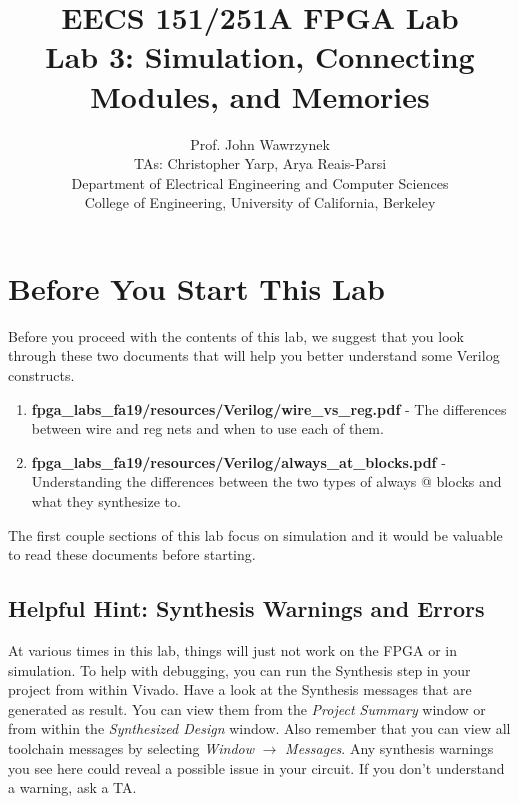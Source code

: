\documentclass[11pt]{article}
\newcommand{\RepoRootPath}{fpga\_labs\_fa19}
\begin{document}
\title{EECS 151/251A FPGA Lab\\
Lab 3: Simulation, Connecting Modules, and Memories}

\author{Prof. John Wawrzynek \\
TAs: Christopher Yarp, Arya Reais-Parsi \\Department of Electrical Engineering and Computer Sciences\\
College of Engineering, University of California, Berkeley}
\date{}
\maketitle

\tableofcontents

\section{Before You Start This Lab}

Before you proceed with the contents of this lab, we suggest that you look through these two documents that will help you better understand some Verilog constructs.

\begin{enumerate}
	\item \textbf{\RepoRootPath/resources/Verilog/wire\_vs\_reg.pdf} - The differences between wire and reg nets and when to use each of them.
	
	\item \textbf{\RepoRootPath/resources/Verilog/always\_at\_blocks.pdf} - Understanding the differences between the two types of always @ blocks and what they synthesize to.
	
\end{enumerate}

The first couple sections of this lab focus on simulation and it would be valuable to read these documents before starting.

\subsection{Helpful Hint: Synthesis Warnings and Errors}
At various times in this lab, things will just not work on the FPGA or in simulation. To help with debugging, you can run the Synthesis step in your project from within Vivado. Have a look at the Synthesis messages that are generated as result. You can view them from the \emph{Project Summary} window or from within the \emph{Synthesized Design} window. Also remember that you can view all toolchain messages by selecting \emph{Window} $\rightarrow$ \emph{Messages}. Any synthesis warnings you see here could reveal a possible issue in your circuit. If you don't understand a warning, ask a TA.
\end{document}

